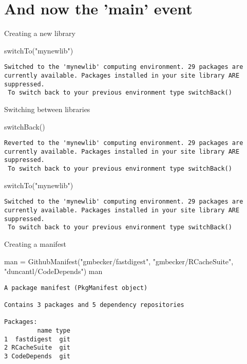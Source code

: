 \documentclass[presentation]{beamer}
\begin{document}
\section{And now the 'main' event}
\label{sec-6}
\begin{frame}[fragile,label=sec-6-1]{Creating a new library}
 \begin{Code}
switchTo("mynewlib")
\end{Code}

\begin{verbatim}
Switched to the 'mynewlib' computing environment. 29 packages are currently available. Packages installed in your site library ARE suppressed.
 To switch back to your previous environment type switchBack()
\end{verbatim}
\end{frame}


\begin{frame}[fragile,label=sec-6-2]{Switching between libraries}
 \begin{Code}
switchBack()
\end{Code}

\begin{verbatim}
Reverted to the 'mynewlib' computing environment. 29 packages are currently available. Packages installed in your site library ARE suppressed.
 To switch back to your previous environment type switchBack()
\end{verbatim}


\begin{Code}
switchTo("mynewlib")
\end{Code}

\begin{verbatim}
Switched to the 'mynewlib' computing environment. 29 packages are currently available. Packages installed in your site library ARE suppressed.
 To switch back to your previous environment type switchBack()
\end{verbatim}
\end{frame}

\begin{frame}[fragile,label=sec-6-3]{Creating a manifest}
 \begin{Code}
man = GithubManifest("gmbecker/fastdigest", "gmbecker/RCacheSuite",
    "duncantl/CodeDepends")
man
\end{Code}

\begin{verbatim}
A package manifest (PkgManifest object)

Contains 3 packages and 5 dependency repositories

Packages:
         name type
1  fastdigest  git
2 RCacheSuite  git
3 CodeDepends  git
\end{verbatim}
\end{frame}
\end{document}
